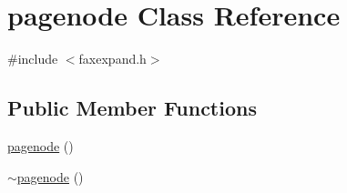 \hypertarget{classpagenode}{\section{pagenode Class Reference}
\label{classpagenode}
}


{\ttfamily \#include $<$faxexpand.\+h$>$}

\subsection*{Public Member Functions}
\begin{DoxyCompactItemize}
\item 
\hyperlink{classpagenode_a9432e6a5ada0c9703978b0e595ffa47c}{pagenode} ()
\item 
\hyperlink{classpagenode_a05629b599319c122cd345fe8dcc2a021}{$\sim$pagenode} ()
\end{DoxyCompactItemize}
